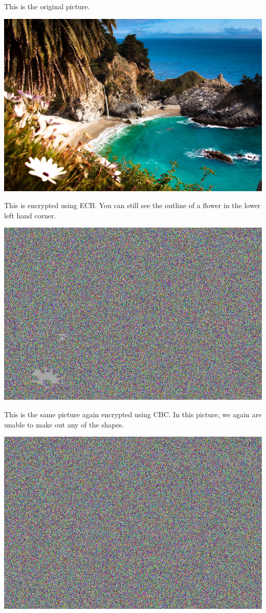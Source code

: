 \documentclass{article}
\begin{document}
This is the original picture.
\begin{center}
    \includegraphics[scale=0.5]{test2.png}
\end{center}
This is encrypted using ECB.  You can still see the outline of a flower in the lower left hand corner.
\begin{center}
    \includegraphics[scale=0.5]{pic_ecb2.png}
\end{center}
This is the same picture again encrypted using CBC.  In this picture, we again are unable to make out any of the shapes.
\begin{center}
    \includegraphics[scale=0.5]{pic_cbc2.png}
\end{center}
\end{document}
